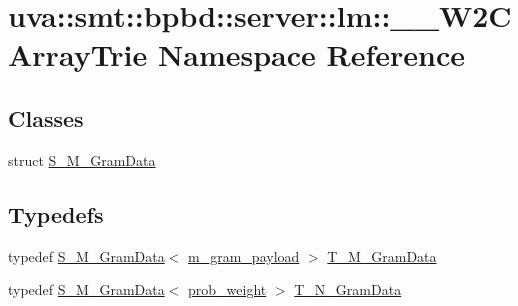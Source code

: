 \hypertarget{namespaceuva_1_1smt_1_1bpbd_1_1server_1_1lm_1_1_____w2_c_array_trie}{}\section{uva\+:\+:smt\+:\+:bpbd\+:\+:server\+:\+:lm\+:\+:\+\_\+\+\_\+\+W2\+C\+Array\+Trie Namespace Reference}
\label{namespaceuva_1_1smt_1_1bpbd_1_1server_1_1lm_1_1_____w2_c_array_trie}
\subsection*{Classes}
\begin{DoxyCompactItemize}
\item 
struct \hyperlink{structuva_1_1smt_1_1bpbd_1_1server_1_1lm_1_1_____w2_c_array_trie_1_1_s___m___gram_data}{S\+\_\+\+M\+\_\+\+Gram\+Data}
\end{DoxyCompactItemize}
\subsection*{Typedefs}
\begin{DoxyCompactItemize}
\item 
typedef \hyperlink{structuva_1_1smt_1_1bpbd_1_1server_1_1lm_1_1_____w2_c_array_trie_1_1_s___m___gram_data}{S\+\_\+\+M\+\_\+\+Gram\+Data}$<$ \hyperlink{namespaceuva_1_1smt_1_1bpbd_1_1server_1_1lm_1_1m__grams_a1422aa6b3f3cb9377916d20e9bf16c0a}{m\+\_\+gram\+\_\+payload} $>$ \hyperlink{namespaceuva_1_1smt_1_1bpbd_1_1server_1_1lm_1_1_____w2_c_array_trie_a4d413639b142daeda71cdadbf01c2b87}{T\+\_\+\+M\+\_\+\+Gram\+Data}
\item 
typedef \hyperlink{structuva_1_1smt_1_1bpbd_1_1server_1_1lm_1_1_____w2_c_array_trie_1_1_s___m___gram_data}{S\+\_\+\+M\+\_\+\+Gram\+Data}$<$ \hyperlink{namespaceuva_1_1smt_1_1bpbd_1_1server_a01e9ea4de9c226f4464862e84ff0bbcc}{prob\+\_\+weight} $>$ \hyperlink{namespaceuva_1_1smt_1_1bpbd_1_1server_1_1lm_1_1_____w2_c_array_trie_aab5ccfad98e04de52009d53b4b55c9f1}{T\+\_\+\+N\+\_\+\+Gram\+Data}
\end{DoxyCompactItemize}

